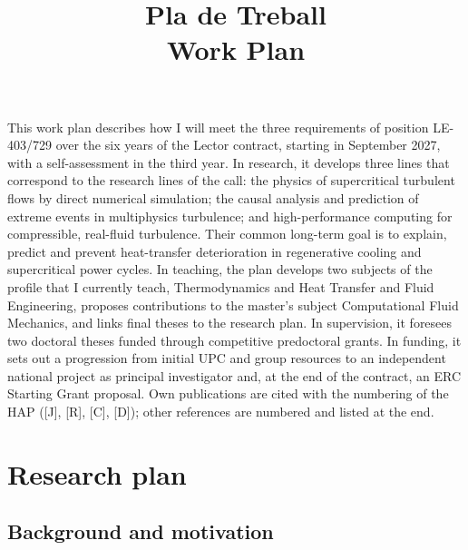 \documentclass[11pt]{article}
\title{\textbf{Pla de Treball}\\[2pt]\large Work Plan}
\author{\Large \CandName}
\date{}
\begin{document}
\maketitle
\thispagestyle{plain}
\vspace{0.5cm}
\begin{center}\postdata\end{center}

This work plan describes how I will meet the three requirements of position LE-403/729
over the six years of the Lector contract, starting in September 2027, with a
self-assessment in the third year. In research, it develops three lines that correspond to
the research lines of the call: the physics of supercritical turbulent flows by direct
numerical simulation; the causal analysis and prediction of extreme events in multiphysics
turbulence; and high-performance computing for compressible, real-fluid turbulence. Their
common long-term goal is to explain, predict and prevent heat-transfer deterioration in
regenerative cooling and supercritical power cycles. In teaching, the plan develops two
subjects of the profile that I currently teach, Thermodynamics and Heat Transfer and Fluid
Engineering, proposes contributions to the master's subject Computational Fluid Mechanics,
and links final theses to the research plan. In supervision, it foresees two doctoral
theses funded through competitive predoctoral grants. In funding, it sets out a progression
from initial UPC and group resources to an independent national project as principal
investigator and, at the end of the contract, an ERC Starting Grant proposal. Own publications are cited with the numbering of the HAP ([J], [R],
[C], [D]); other references are numbered and listed at the end.

\newpage
\tableofcontents

\section{Research plan}\label{sec:research}

\subsection{Background and motivation}\label{sec:background}
\end{document}
